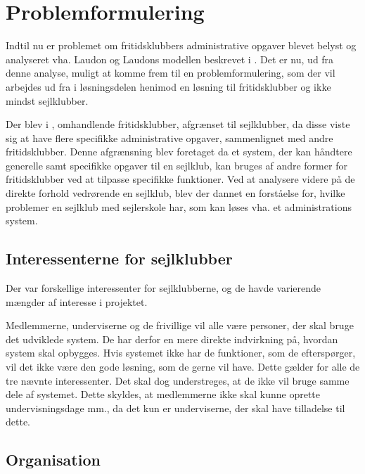 \chapter{Problemformulering}\label{chap:problemformulering-new}

Indtil nu er problemet om fritidsklubbers administrative opgaver blevet belyst og analyseret vha. Laudon og Laudons modellen beskrevet i . 
Det er nu, ud fra denne analyse, muligt at komme frem til en problemformulering, som der vil arbejdes ud fra i løsningsdelen henimod en løsning til fritidsklubber og ikke mindst sejlklubber.

Der blev i , omhandlende fritidsklubber, afgrænset til sejlklubber, da disse viste sig at have flere specifikke administrative opgaver, sammenlignet med andre fritidsklubber. 
Denne afgrænsning blev foretaget da et system, der kan håndtere generelle samt specifikke opgaver til en sejlklub, kan bruges af andre former for fritidsklubber ved at tilpasse specifikke funktioner.
Ved at analysere videre på de direkte forhold vedrørende en sejlklub, blev der dannet en forståelse for, hvilke problemer en sejlklub med sejlerskole har, som kan løses vha. et administrations system.


\section{Interessenterne for sejlklubber}

Der var forskellige interessenter for sejlklubberne, og de havde varierende mængder af interesse i projektet. 

Medlemmerne, underviserne og de frivillige vil alle være personer, der skal bruge det udviklede system. 
De har derfor en mere direkte indvirkning på, hvordan system skal opbygges. 
Hvis systemet ikke har de funktioner, som de efterspørger, vil det ikke være den gode løsning, som de gerne vil have. 
Dette gælder for alle de tre nævnte interessenter. 
Det skal dog understreges, at de ikke vil bruge samme dele af systemet. 
Dette skyldes, at medlemmerne ikke skal kunne oprette undervisningsdage mm., da det kun er underviserne, der skal have tilladelse til dette. 

\section{Organisation}


